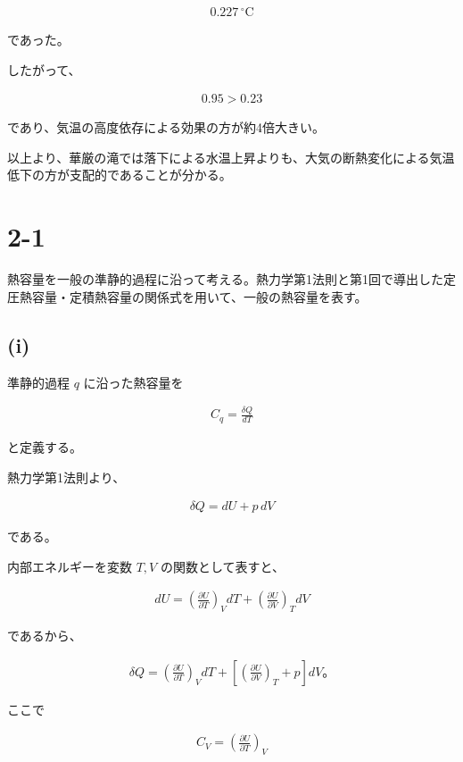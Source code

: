 \documentclass[platex,dvipdfmx,a4paper]{jsarticle}
\begin{document}
\begin{align*}
0.227\,^\circ\mathrm{C}
\end{align*}

であった。

したがって、

\begin{align*}
0.95
>
0.23
\end{align*}

であり、気温の高度依存による効果の方が約4倍大きい。

以上より、華厳の滝では落下による水温上昇よりも、大気の断熱変化による気温低下の方が支配的であることが分かる。
\section{2-1}

熱容量を一般の準静的過程に沿って考える。熱力学第1法則と第1回で導出した定圧熱容量・定積熱容量の関係式を用いて、一般の熱容量を表す。

\subsection{(i)}

準静的過程 $q$ に沿った熱容量を

\begin{align*}
C_q
=
\frac{\delta Q}{dT}
\end{align*}

と定義する。

熱力学第1法則より、

\begin{align*}
\delta Q
=
dU+p\,dV
\end{align*}

である。

内部エネルギーを変数 $T,V$ の関数として表すと、

\begin{align*}
dU
=
\left(\frac{\partial U}{\partial T}\right)_V dT
+
\left(\frac{\partial U}{\partial V}\right)_T dV
\end{align*}

であるから、

\begin{align*}
\delta Q
=
\left(\frac{\partial U}{\partial T}\right)_V dT
+
\left[
\left(\frac{\partial U}{\partial V}\right)_T+p
\right]dV。
\end{align*}

ここで

\begin{align*}
C_V
=
\left(\frac{\partial U}{\partial T}\right)_V
\end{align*}
\end{document}

